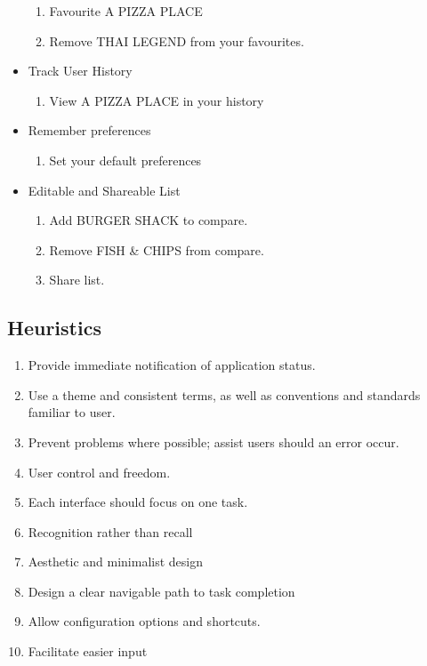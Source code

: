 \documentclass[a4 paper, 10pt]{article}
\begin{document}
\begin{multicols}{2}
\begin{itemize}
                    \begin{enumerate}[resume]
                        \item Favourite A PIZZA PLACE
                        \item Remove THAI LEGEND from your favourites.
                    \end{enumerate}
                \item Track User History
                    \begin{enumerate}[resume]
                        \item View A PIZZA PLACE in your history
                    \end{enumerate}
                \item Remember preferences
                    \begin{enumerate}[resume]
                        \item Set your default preferences
                    \end{enumerate}
                \item Editable and Shareable List
                    \begin{enumerate}[resume]
                        \item Add BURGER SHACK to compare.
                        \item Remove FISH \& CHIPS from compare.
                        \item Share list.
                    \end{enumerate}
            \end{itemize}
        \end{multicols}

    \subsection*{Heuristics}
        \begin{multicols}{2}
            \begin{enumerate}
                \item Provide immediate notification of application status.
                \item Use a theme and consistent terms, as well as conventions and standards familiar to user. 
                \item Prevent problems where possible; assist users should an error occur.
                \item User control and freedom.
                \item Each interface should focus on one task. 
                \item Recognition rather than recall
                \item Aesthetic and minimalist design
                \item Design a clear navigable path to task completion  
                \item Allow configuration options and shortcuts.
                \item Facilitate easier input
            \end{enumerate}
        \end{multicols}
\end{document}
